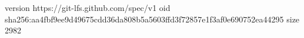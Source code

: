 version https://git-lfs.github.com/spec/v1
oid sha256:aa4fbf9ee9d49675cdd36da808b5a5603ffd3f72857e1f3af0e690752ea44295
size 2982
